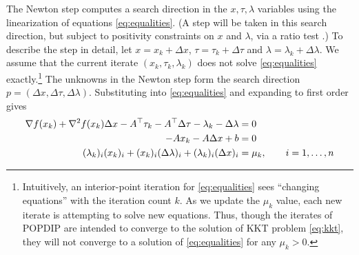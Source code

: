 \documentclass[11pt]{article}
\newcommand{\grad}{\nabla}
\begin{document}
The Newton step computes a search direction in the $x,\tau,\lambda$ variables using the linearization of equations \eqref{eq:equalities}.  (A step will be taken in this search direction, but subject to positivity constraints on $x$ and $\lambda$, via a ratio test \cite[section 3.1]{GrivaNashSofer2009}.)  To describe the step in detail, let $x=x_k+\Delta x$, $\tau=\tau_k+\Delta\tau$ and $\lambda=\lambda_k+\Delta\lambda$.  We assume that the current iterate $(x_k,\tau_k,\lambda_k)$ does not solve \eqref{eq:equalities} exactly.\footnote{Intuitively, an interior-point iteration for \eqref{eq:equalities} sees ``changing equations'' with the iteration count $k$.  As we update the $\mu_k$ value, each new iterate is attempting to solve new equations.  Thus, though the iterates of POPDIP are intended to converge to the solution of KKT problem \eqref{eq:kkt}, they will not converge to a solution of \eqref{eq:equalities} for any $\mu_k>0$.}  The unknowns in the Newton step form the search direction $p=(\Delta x,\Delta\tau,\Delta\lambda)$.  Substituting into \eqref{eq:equalities} and expanding to first order gives
\begin{align}
\grad f(x_k) + \grad^2 f(x_k) \Delta x - A^\top \tau_k - A^\top \Delta \tau - \lambda_k - \Delta \lambda &= 0 \label{eq:prenewtonstep} \\
-A x_k - A \Delta x + b &= 0 \notag \\
(\lambda_k)_i (x_k)_i + (x_k)_i (\Delta\lambda)_i + (\lambda_k)_i (\Delta x)_i &= \mu_k, \qquad i=1,\dots,n \notag
\end{align}
\end{document}
